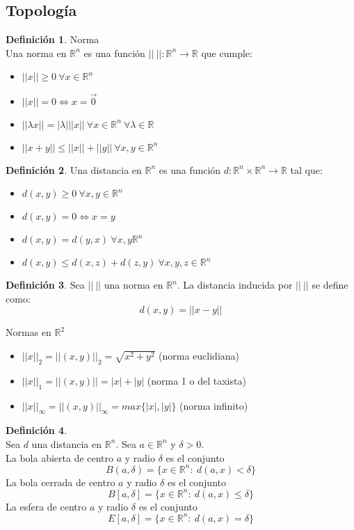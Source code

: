 \documentclass[10pt]{article}
\theoremstyle{definition}
\newtheorem{definition}{Definición}[section]
\begin{document}
\subsection{Topología}
\begin{definition}{Norma}
	\\Una norma en $\mathbb{R}^n$ es una función $||\ ||:\mathbb{R}^n\to\mathbb{R}$ que cumple:
	\begin{itemize}
		\item $||x||\ge 0\ \forall x\in\mathbb{R}^n$
		\item $||x||=0\Leftrightarrow x=\vec{0}$
		\item $||\lambda x||=|\lambda|||x||\ \forall x\in\mathbb{R}^n\ \forall\lambda\in\mathbb{R}$
		\item $||x+y||\le ||x||+||y||\ \forall x,y\in\mathbb{R}^n$
	\end{itemize}
\end{definition}
\begin{definition}
	Una distancia en $\mathbb{R}^n$ es una función $d:\mathbb{R}^n\times\mathbb{R}^n\to\mathbb{R}$ tal que:
	\begin{itemize}
		\item $d(x,y)\ge 0\ \forall x,y\in\mathbb{R}^n$
		\item $d(x,y)=0\Leftrightarrow x=y$
		\item $d(x,y)=d(y,x)\ \forall x,y\mathbb{R}^n$
		\item $d(x,y)\le d(x,z)+d(z,y)\ \forall x,y,z\in\mathbb{R}^n$
	\end{itemize}
\end{definition}
\begin{definition}
	Sea $||\ ||$ una norma en $\mathbb{R}^n$. La distancia inducida por $||\ ||$ se define como: $$d(x,y)=||x-y||$$
\end{definition}
Normas en $\mathbb{R}^2$
\begin{itemize}
	\item $||x||_2=||(x,y)||_2=\sqrt{x^2+y^2}$ (norma euclidiana)
	\item $||x||_1=||(x,y)||=|x|+|y|$ (norma 1 o del taxista)
	\item $||x||_{\infty}=||(x,y)||_{\infty}=max\{|x|,|y|\}$ (norma infinito)
\end{itemize}
\begin{definition}{ \ }
	\\Sea $d$ una distancia en $\mathbb{R}^n$. Sea $a\in\mathbb{R}^n$ y $\delta >0$.
	\\La bola abierta de centro $a$ y radio $\delta$ es el conjunto $$B(a,\delta)=\{x\in\mathbb{R}^n :\ d(a,x)<\delta \}$$
	La bola cerrada de centro $a$ y radio $\delta$ es el conjunto $$B[a,\delta]=\{x\in\mathbb{R}^n :\ d(a,x)\le\delta \}$$
	La esfera de centro $a$ y radio $\delta$ es el conjunto $$E[a,\delta]=\{x\in\mathbb{R}^n:\ d(a,x)=\delta \}$$
\end{definition}
\end{document}
